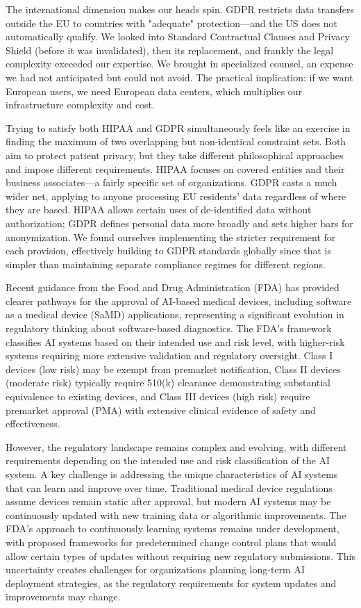 \documentclass[12pt,a4paper]{article}
\begin{document}
The international dimension makes our heads spin. GDPR restricts data transfers outside the EU to countries with "adequate" protection—and the US does not automatically qualify. We looked into Standard Contractual Clauses and Privacy Shield (before it was invalidated), then its replacement, and frankly the legal complexity exceeded our expertise. We brought in specialized counsel, an expense we had not anticipated but could not avoid. The practical implication: if we want European users, we need European data centers, which multiplies our infrastructure complexity and cost.

Trying to satisfy both HIPAA and GDPR simultaneously feels like an exercise in finding the maximum of two overlapping but non-identical constraint sets. Both aim to protect patient privacy, but they take different philosophical approaches and impose different requirements. HIPAA focuses on covered entities and their business associates—a fairly specific set of organizations. GDPR casts a much wider net, applying to anyone processing EU residents' data regardless of where they are based. HIPAA allows certain uses of de-identified data without authorization; GDPR defines personal data more broadly and sets higher bars for anonymization. We found ourselves implementing the stricter requirement for each provision, effectively building to GDPR standards globally since that is simpler than maintaining separate compliance regimes for different regions.

Recent guidance from the Food and Drug Administration (FDA) \cite{fda2021ai} has provided clearer pathways for the approval of AI-based medical devices, including software as a medical device (SaMD) applications, representing a significant evolution in regulatory thinking about software-based diagnostics. The FDA's framework classifies AI systems based on their intended use and risk level, with higher-risk systems requiring more extensive validation and regulatory oversight. Class I devices (low risk) may be exempt from premarket notification, Class II devices (moderate risk) typically require 510(k) clearance demonstrating substantial equivalence to existing devices, and Class III devices (high risk) require premarket approval (PMA) with extensive clinical evidence of safety and effectiveness.

However, the regulatory landscape remains complex and evolving, with different requirements depending on the intended use and risk classification of the AI system. A key challenge is addressing the unique characteristics of AI systems that can learn and improve over time. Traditional medical device regulations assume devices remain static after approval, but modern AI systems may be continuously updated with new training data or algorithmic improvements. The FDA's approach to continuously learning systems remains under development, with proposed frameworks for predetermined change control plans that would allow certain types of updates without requiring new regulatory submissions. This uncertainty creates challenges for organizations planning long-term AI deployment strategies, as the regulatory requirements for system updates and improvements may change.
\end{document}
